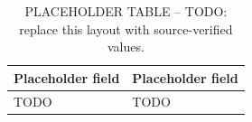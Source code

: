 \begin{table}[t]
  \centering
  \caption{PLACEHOLDER TABLE -- TODO: replace this layout with source-verified values.}
  \label{tab:placeholder-layout}
  \begin{tabular}{p{}p{}}
    \hline
    Placeholder field & Placeholder field \\
    \hline
    TODO & TODO \\
    \hline
  \end{tabular}
\end{table}
